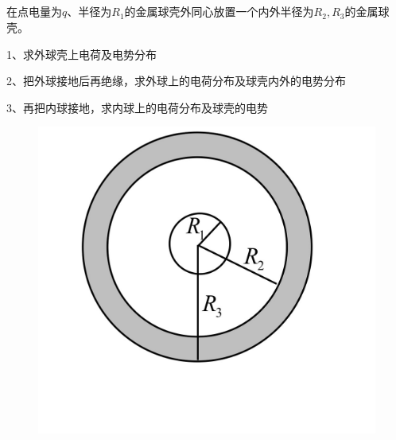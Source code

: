 \documentclass[lang=cn,10pt]{elegantbook}
\begin{document}
		\subsection{\color{red} }
		\begin{example}
			在点电量为$q$、半径为$R_{1}$的金属球壳外同心放置一个内外半径为$R_{2},R_{3}$的金属球壳。
			
			1、求外球壳上电荷及电势分布
			
			2、把外球接地后再绝缘，求外球上的电荷分布及球壳内外的电势分布
			
			3、再把内球接地，求内球上的电荷分布及球壳的电势
			
			\begin{figure}[H]
				\centering
				\includegraphics[width=0.2\linewidth]{image/IMG_0417(20231117-191724)}
				\caption{}
				\label{fig:img041720231117-191724}
			\end{figure}
		\end{example}
\end{document}
